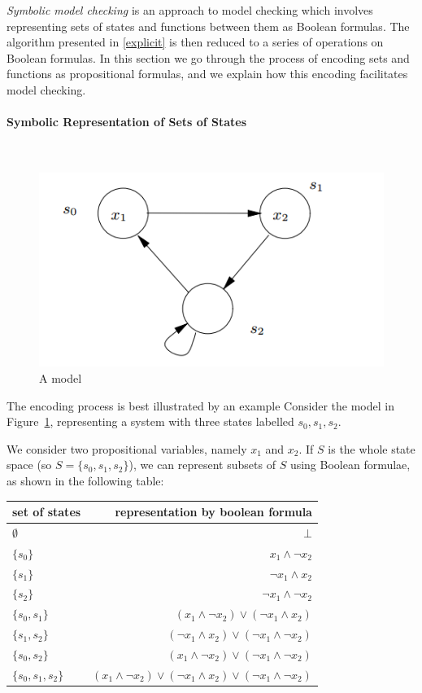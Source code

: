 \documentclass[12]{article}
\newcommand{\myparagraph}[1]{\paragraph{#1}\mbox{}\\}
\begin{document}
\textit{Symbolic model checking} is an approach to model checking which involves representing sets of states and functions between them as Boolean formulas. The algorithm presented in \ref{explicit} is then reduced to a series of operations on Boolean formulas. In this section we go through the process of encoding sets and functions as propositional formulas, and we explain how this encoding facilitates model checking.

\myparagraph{Symbolic Representation of Sets of States}
\label{symbolic}
\begin{figure}
    \centering
    \includegraphics[scale=0.55]{symbolic_model_checking_example.PNG}
    \caption{A model}
    \label{fig:model_example}
\end{figure}

The encoding process is best illustrated by an example  \cite{logic_in_computer_science}
Consider the model in Figure~\ref {fig:model_example}, representing a system with three states labelled $s_0, s_1, s_2$. 

We consider two propositional variables, namely $x_1$ and $x_2$.  
If $S$ is the whole state space (so $S = \{s_0, s_1, s_2\}$), we can represent subsets of $S$ using Boolean formulae, as shown in the following table:\\

\begin{tabular}{ l | r }
  set of states & representation by boolean formula \\ \hline
$\emptyset $&   $\bot$ \\
$\{ s_0\}$ & $x_1 \land \lnot x_2 $\\
$\{ s_1\}$ & $ \lnot x_1 \land x_2 $\\
$\{ s_2\}$ & $\lnot x_1 \land \lnot x_2 $\\
$\{ s_0, s_ 1\}$ & $(x_1 \land \lnot x_2) \lor (\lnot x_1 \land x_2)  $\\
$\{ s_1, s_2\}$ & $(\lnot x_1 \land  x_2) \lor (\lnot x_1 \land\lnot x_2)$\\
$\{ s_0, s_2\}$ & $(x_1 \land \lnot x_2) \lor (\lnot x_1 \land\lnot x_2) $\\
$\{ s_0, s_1, s_2\}$ & $(x_1 \land \lnot x_2) \lor (\lnot x_1 \land  x_2) \lor (\lnot x_1 \land\lnot x_2)$
\end{tabular}
\\
\\
\end{document}
